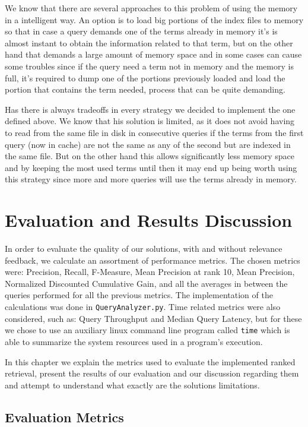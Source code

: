 \documentclass[12pt]{article}
\begin{document}
We know that there are several approaches to this problem of using the memory in a intelligent way. An option is to load big portions of the index files to memory so that in case a query demands one of the terms already in memory it's is almost instant to obtain the information related to that term, but on the other hand that demands a large amount of memory space and in some cases can cause some troubles since if the query need a term not in memory and the memory is full, it's required to dump one of the portions previously loaded and load the portion that contains the term needed, process that can be quite demanding.

Has there is always tradeoffs in every strategy we decided to implement the one defined above. We know that his solution is limited, as it does not avoid having to read from the same  file in disk in consecutive queries if the terms from the first query (now in  cache) are not the same as any of the second but are indexed in the same file. But on the other hand this allows significantly less memory space and by keeping the most used terms until then it may end up being worth using this strategy since more and more queries will use the terms already in memory.

\newpage
\section{Evaluation and Results Discussion}

In order to evaluate the quality of our solutions, with and without relevance 
feedback, we calculate an assortment of performance metrics.
The chosen metrics were: Precision, Recall, F-Measure, Mean Precision at rank 10, 
Mean Precision, Normalized Discounted Cumulative Gain, and all the averages in 
between the queries performed for all the previous metrics.
The implementation of the calculations was done in \texttt{QueryAnalyzer.py}.
Time related metrics were also considered, such as: Query Throughput and Median 
Query Latency, but for these we chose to use an auxiliary linux command line 
program called \texttt{time} which is able to summarize the system resources 
used in a program's execution.

In this chapter we explain the metrics used to evaluate the implemented ranked
retrieval, present the results of our evaluation and our discussion regarding 
them and attempt to understand what exactly are the solutions limitations.

\subsection{Evaluation Metrics} \label{metrics}
\end{document}
